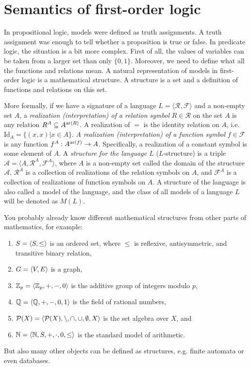 \section{Semantics of first-order logic}

In propositional logic, models were defined as truth assignments. A truth assignment was enough to tell whether a proposition is true or false. In predicate logic, the situation is a bit more complex. First of all, the values of variables can be taken from a larger set than only $\{0,1\}$. Moreover, we need to define what all the functions and relations mean. A natural representation of models in first-order logic is a mathematical structure. A structure is a set and a definition of functions and relations on this set. 

More formally, if we have a signature of a language $L = \langle \mathcal{R}, \mathcal{F} \rangle$ and a non-empty set $A$, a \emph{realization (interpretation) of a relation symbol} $R \in \mathcal{R}$ on the set $A$ is any relation $R^A \subseteq A^{\operatorname{ar}(R)}$. A realization of $=$ is the identity relation on $A$, i.e. $\mathrm{Id}_A = \{(x, x) | x \in A\}$. \emph{A realization (interpretation) of a function symbol} $f \in \mathcal{F}$ is any function $f^A: A^{\operatorname{ar}(f)} \to A$. Specifically, a realization of a constant symbol is some element of $A$. A \emph{structure for the language $L$} ($L$-structure) is a triple $\mathcal{A} = \langle A, \mathcal{R}^A, \mathcal{F}^A \rangle$, where $A$ is a non-empty set called the domain of the structure $\mathcal{A}$, $\mathcal{R}^A$ is a collection of realizations of the relation symbols on $A$, and $\mathcal{F}^A$ is a collection of realizations of function symbols on $A$. A structure of the language is also called a model of the language, and the class of all models of a language $L$ will be denoted as $M(L)$.

You probably already know different mathematical structures from other parts of mathematics, for example:
\begin{enumerate}
	\item $S = \langle S, \leq \rangle$ is an ordered set, where $\leq$ is reflexive, antisymmetric, and transitive binary relation,
	\item $G = \langle V, E \rangle$ is a graph,
	\item $\mathbb{Z}_p = \langle \mathbb{Z}_p, +, -, 0 \rangle$ is the additive group of integers modulo $p$,
	\item $\mathbb{Q} = \langle \mathbb{Q}, +, -, 0, 1 \rangle$ is the field of rational numbers,
	\item $\mathcal{P}(X) = \langle \mathcal{P}(X), \setminus, \cap, \cup, \emptyset, X \rangle$ is the set algebra over $X$, and
	\item $\mathbb{N} = \langle \mathbb{N}, S, +, \cdot, 0, \leq \rangle$ is the standard model of arithmetic.
\end{enumerate}
But also many other objects can be defined as structures, e.g. finite automata or even databases.

